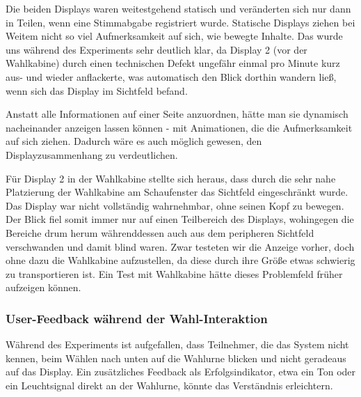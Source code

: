 Die beiden Displays waren weitestgehend statisch und veränderten sich nur dann in Teilen, wenn eine Stimmabgabe registriert wurde.
Statische Displays ziehen bei Weitem nicht so viel Aufmerksamkeit auf sich, wie bewegte Inhalte.
Das wurde uns während des Experiments sehr deutlich klar, da Display 2 (vor der Wahlkabine) durch einen technischen Defekt ungefähr einmal pro Minute kurz aus- und wieder anflackerte, was automatisch den Blick dorthin wandern ließ, wenn sich das Display im Sichtfeld befand.

Anstatt alle Informationen auf einer Seite anzuordnen, hätte man sie dynamisch nacheinander anzeigen lassen können - mit Animationen, die die Aufmerksamkeit auf sich ziehen.
Dadurch wäre es auch möglich gewesen, den Displayzusammenhang zu verdeutlichen.

Für Display 2 in der Wahlkabine stellte sich heraus, dass durch die sehr nahe Platzierung der Wahlkabine am Schaufenster das Sichtfeld eingeschränkt wurde.
Das Display war nicht vollständig wahrnehmbar, ohne seinen Kopf zu bewegen.
Der Blick fiel somit immer nur auf einen Teilbereich des Displays, wohingegen die Bereiche drum herum währenddessen auch aus dem peripheren Sichtfeld verschwanden und damit blind waren.
Zwar testeten wir die Anzeige vorher, doch ohne dazu die Wahlkabine aufzustellen, da diese durch ihre Größe etwas schwierig zu transportieren ist.
Ein Test mit Wahlkabine hätte dieses Problemfeld früher aufzeigen können.

\subsubsection{User-Feedback während der Wahl-Interaktion}\label{user-feedback-bei-der-wahl-interaktion}

Während des Experiments ist aufgefallen, dass Teilnehmer, die das System nicht kennen, beim Wählen nach unten auf die Wahlurne blicken und nicht geradeaus auf das Display.
Ein zusätzliches Feedback als Erfolgsindikator, etwa ein Ton oder ein Leuchtsignal direkt an der Wahlurne, könnte das Verständnis erleichtern.